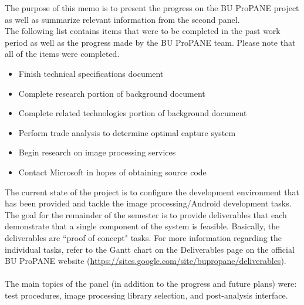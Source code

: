 \documentclass{texMemo}
\begin{document}
\setlength{\parindent}{0pt}
\maketitle
\noindent
The purpose of this memo is to present the progress on the BU ProPANE project as well as summarize relevant information from the second panel. \\

The following list contains items that were to be completed in the past work period as well as the progress made by the BU ProPANE team. Please note that all of the items were completed.
\begin{itemize}
	\item Finish technical specifications document
	\item Complete research portion of background document
	\item Complete related technologies portion of background document
	\item Perform trade analysis to determine optimal capture system 
	\item Begin research on image processing services 
	\item Contact Microsoft in hopes of obtaining source code 
\end{itemize}

The current state of the project is to configure the development environment that has been provided and tackle the image processing/Android development tasks. The goal for the remainder of the semester is to provide deliverables that each demonstrate that a single component of the system is feasible. Basically, the deliverables are ``proof of concept" tasks. For more information regarding the individual tasks, refer to the Gantt chart on the Deliverables page on the official BU ProPANE website (\url{https://sites.google.com/site/bupropane/deliverables}).\\ 
\\
The main topics of the panel (in addition to the progress and future plans) were: test procedures, image processing library selection, and post-analysis interface. 
\end{document}
